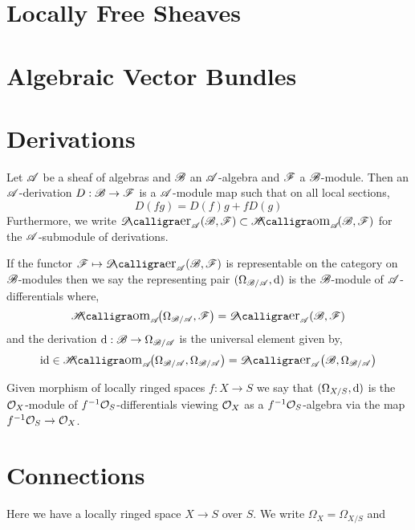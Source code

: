 \documentclass[12pt]{article}
\begin{document}
\section{Locally Free Sheaves}

\section{Algebraic Vector Bundles}

\section{Derivations}

\begin{defn}
Let $\mathscr{A}$ be a sheaf of algebras and $\mathscr{B}$ an $\mathscr{A}$-algebra and $\mathscr{F}$ a $\mathscr{B}$-module. Then an $\mathscr{A}$-derivation $D : \mathscr{B} \to \mathscr{F}$ is a $\mathscr{A}$-module map such that on all local sections,
\[ D(fg) = D(f) g + f D(g) \]
Furthermore, we write $\shDero{\sA}{\sB}{\F} \subset \shHom{\sA}{\sB}{\F}$ for the $\mathscr{A}$-submodule of derivations.
\end{defn}

\begin{defn}
If the functor $\F \mapsto \shDero{\sA}{\sB}{\F}$ is representable on the category on $\mathscr{B}$-modules then we say the representing pair $(\Omega_{\mathscr{B}/\mathscr{A}}, \mathrm{d})$ is the $\mathscr{B}$-module of $\mathscr{A}$-differentials where,
\[ \shHom{\sA}{\Omega_{\sB/\sA}}{\F} = \shDero{\sA}{\sB}{\F} \]
and the derivation $\mathrm{d} : \mathscr{B} \to \Omega_{\mathscr{B}/\mathscr{A}}$ is the universal element given by,
\[ \id \in \shHom{\sA}{\Omega_{\sB/\sA}}{\Omega_{\sB/\sA}} = \shDero{\sA}{\sB}{\Omega_{\sB/\sA}} \]
\end{defn}

\begin{defn}
Given morphism of locally ringed spaces $f : X \to S$ we say that $(\Omega_{X/S}, \mathrm{d})$ is the $\mathcal{O}_{X}$-module of $f^{-1} \mathcal{O}_{S}$-differentials viewing $\mathcal{O}_{X}$ as a $f^{-1} \mathcal{O}_{S}$-algebra via the map $f^{-1} \mathcal{O}_{S} \to \mathcal{O}_{X}$.
\end{defn}

\section{Connections}

\begin{rmk}
Here we have a locally ringed space $X \to S$ over $S$. We write $\Omega_X = \Omega_{X/S}$ and 
\end{rmk}
\end{document}
